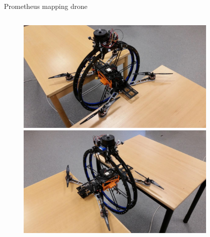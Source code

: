 \documentclass[]{beamer}
\begin{document}
	\begin{frame}{Prometheus mapping drone}
		\centering
		\begin{columns}
			\begin{column}{.5\textwidth}
				\centering
				\begin{figure}
					\includegraphics[scale=0.17]{images/prometheus1.jpg} \\
					\vspace{5pt}
					\includegraphics[scale=0.17]{images/prometheus2.jpg}
				\end{figure}
			\end{column}
			\begin{column}{.5\textwidth}
				\centering
				\begin{figure}

\end{figure}
\end{column}
\end{columns}
\end{frame}
\end{document}
